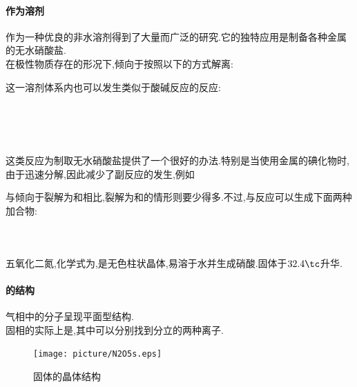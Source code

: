 \documentclass{ctexart}
\begin{document}
\paragraph{作为溶剂}
作为一种优良的非水溶剂得到了大量而广泛的研究.它的独特应用是制备各种金属的无水硝酸盐.\\
\indent 在极性物质存在的形况下,倾向于按照以下的方式解离:
\begin{center}
\end{center}
这一溶剂体系内也可以发生类似于酸碱反应的反应:
\begin{center}
    \\
    \\
    \\
\end{center}
这类反应为制取无水硝酸盐提供了一个很好的办法.特别是当使用金属的碘化物时,由于迅速分解,因此减少了副反应的发生,例如
\begin{center}
\end{center}
\indent 与倾向于裂解为和相比,裂解为和的情形则要少得多.不过,与反应可以生成下面两种加合物:
\begin{center}
    \\
\end{center}
\subsubsection{}
\begin{substance}[\ce{N2O5}]
    五氧化二氮,化学式为,是无色柱状晶体,易溶于水并生成硝酸.固体于$32.4\tc$升华.
\end{substance}
\paragraph{的结构}
气相中的分子呈现平面型结构.\\
\indent 固相的实际上是\ce{[NO2]+[NO3]-},其中可以分别找到分立的两种离子.
\begin{figure}[H]
    \centering\texttt{[image: picture/N2O5s.eps]}\caption{固体的晶体结构}
\end{figure}
\end{document}
